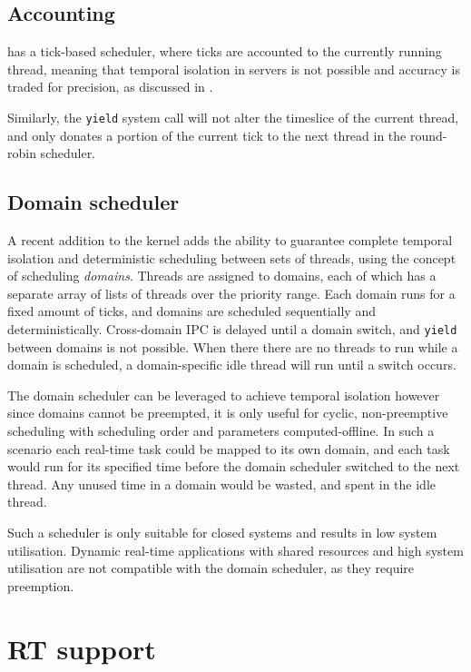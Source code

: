 \subsection{Accounting}
\selfour has a tick-based scheduler, where ticks are accounted to the currently running thread,
meaning that temporal isolation in servers is not possible and accuracy is traded for precision, as
discussed in .

Similarly, the \texttt{yield} system call will not alter the timeslice of the current thread, and
only donates a portion of the current tick to the next thread in the round-robin scheduler. 

\subsection{Domain scheduler}

A recent addition to the \selfour kernel adds the ability to guarantee complete temporal isolation and deterministic scheduling between sets of threads, using the concept of scheduling \emph{domains}.
Threads are assigned to domains, each of which has a separate array of lists of threads over the priority range.
Each domain runs for a fixed amount of ticks, and domains are scheduled sequentially and deterministically.
Cross-domain \gls{IPC} is delayed until a domain switch, and \texttt{yield} between domains is not
possible. When there there are no threads to run while a domain is scheduled, a domain-specific idle thread will run until a switch occurs.

The domain scheduler can be leveraged to achieve temporal isolation however since domains cannot be
preempted, it is only useful for cyclic, non-preemptive scheduling with scheduling order and
parameters computed-offline.
In such a scenario each real-time task could be mapped to its own domain, and each task would run for its specified time before the domain scheduler switched to the next thread.
Any unused time in a domain would be wasted, and spent in the idle thread.

Such a scheduler is only suitable for closed systems and results in low system utilisation.
Dynamic real-time applications with shared resources and high system utilisation are not compatible
with the domain scheduler, as they require preemption.

\section{RT support}

